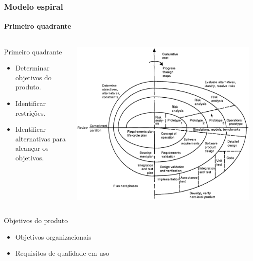 \begin{frame}
	\frametitle{Modelo espiral}
	\framesubtitle{Primeiro quadrante}

	\begin{columns}
		\begin{block:fact}{Primeiro quadrante}
			\begin{itemize}
				\item Determinar objetivos do produto.
				\item Identificar restrições.
				\item Identificar alternativas para alcançar os objetivos.
			\end{itemize}
		\end{block:fact}

		\begin{block:fact}{}
			\centering
			\includegraphics[width=\textwidth]{software-engineering/project-management/process/sdlc/spiral/spiral}
		\end{block:fact}
	\end{columns}
	
	\begin{block:fact}{Objetivos do produto}
		\begin{itemize}
			\item Objetivos organizacionais
			\item Requisitos de qualidade em uso
		\end{itemize}
	\end{block:fact}
	
\end{frame}


